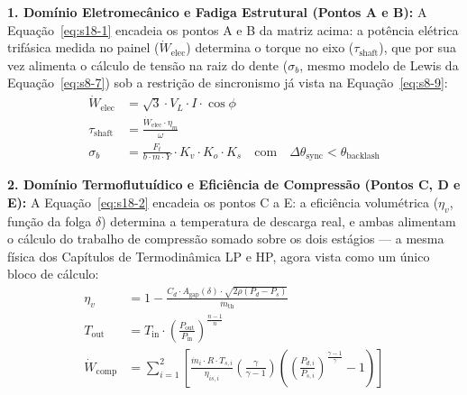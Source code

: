 \documentclass[12pt,a4paper]{article}
\numberwithin{equation}{section}
\numberwithin{table}{section}
\numberwithin{figure}{section}
\begin{document}
{\textbf{1. Domínio Eletromecânico e Fadiga Estrutural (Pontos A e B):} A Equação~\eqref{eq:s18-1} encadeia os pontos A e B da matriz acima: a potência elétrica trifásica medida no painel ($\dot{W}_{\text{elec}}$) determina o torque no eixo ($\tau_{\text{shaft}}$), que por sua vez alimenta o cálculo de tensão na raiz do dente ($\sigma_b$, mesmo modelo de Lewis da Equação~\eqref{eq:s8-7}) sob a restrição de sincronismo já vista na Equação~\eqref{eq:s8-9}:
\begin{equation}\label{eq:s18-1}
\begin{aligned}
	\dot{W}_{\text{elec}} &= \sqrt{3} \cdotp V_L \cdotp I \cdotp \cos \phi \\[8pt]
	\tau_{\text{shaft}} &= \frac{\dot{W}_{\text{elec}} \cdotp \eta_m}{\omega} \\[8pt]
	\sigma_b &= \frac{F_t}{b \cdotp m \cdotp Y} \cdotp K_v \cdotp K_o \cdotp K_s \quad \text{com} \quad \Delta \theta_{\text{sync}} < \theta_{\text{backlash}}
\end{aligned}
\end{equation}

\textbf{2. Domínio Termoflutuídico e Eficiência de Compressão (Pontos C, D e E):} A Equação~\eqref{eq:s18-2} encadeia os pontos C a E: a eficiência volumétrica ($\eta_v$, função da folga $\delta$) determina a temperatura de descarga real, e ambas alimentam o cálculo do trabalho de compressão somado sobre os dois estágios — a mesma física dos Capítulos de Termodinâmica LP e HP, agora vista como um único bloco de cálculo:
\begin{equation}\label{eq:s18-2}
\begin{aligned}
	\eta_{v} &= 1 - \frac{C_d \cdotp A_{\text{gap}}(\delta) \cdotp \sqrt{2\rho (P_d - P_s)}}{\dot{m}_{\text{th}}} \\[8pt]
	T_{\text{out}} &= T_{\text{in}} \cdotp \left( \frac{P_{\text{out}}}{P_{\text{in}}} \right)^{\frac{n-1}{n}} \\[8pt]
	\dot{W}_{\text{comp}} &= \sum_{i=1}^{2} \left[ \frac{\dot{m}_i \cdotp R \cdotp T_{s,i}}{\eta_{is,i}} \left( \frac{\gamma}{\gamma - 1} \right) \left( \left( \frac{P_{d,i}}{P_{s,i}} \right)^{\frac{\gamma-1}{\gamma}} - 1 \right) \right]
\end{aligned}
\end{equation}

}
\end{document}
